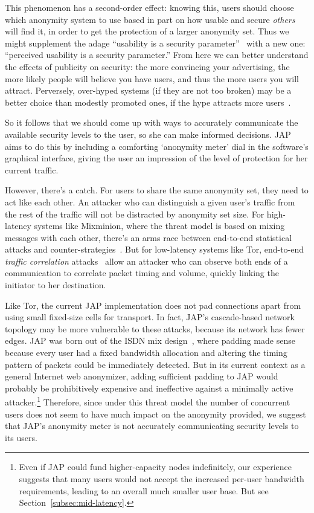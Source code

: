 \documentclass{llncs}
\begin{document}
This phenomenon has a second-order effect: knowing this, users should
choose which anonymity system to use based in part on how usable
and secure
\emph{others} will find it, in order to get the protection of a larger
anonymity set. Thus we might supplement the adage ``usability is a security
parameter''~\cite{back01} with a new one: ``perceived usability is a
security parameter.'' From here we can better understand the effects
of publicity on security: the more convincing your
advertising, the more likely people will believe you have users, and thus
the more users you will attract. Perversely, over-hyped systems (if they
are not too broken) may be a better choice than modestly promoted ones,
if the hype attracts more users~\cite{usability-network-effect}.

So it follows that we should come up with ways to accurately communicate
the available security levels to the user, so she can make informed
decisions. JAP aims to do this by including a
comforting `anonymity meter' dial in the software's graphical interface,
giving the user an impression of the level of protection for her current
traffic.

However, there's a catch. For users to share the same anonymity set,
they need to act like each other. An attacker who can distinguish
a given user's traffic from the rest of the traffic will not be
distracted by anonymity set size. For high-latency systems like
Mixminion, where the threat model is based on mixing messages with each
other, there's an arms race between end-to-end statistical attacks and
counter-strategies~\cite{statistical-disclosure,minion-design,e2e-traffic,trickle02}.
But for low-latency systems like Tor, end-to-end \emph{traffic
correlation} attacks~\cite{danezis-pet2004,defensive-dropping,SS03}
allow an attacker who can observe both ends of a communication
to correlate packet timing and volume, quickly linking
the initiator to her destination. %

Like Tor, the current JAP implementation does not pad connections
apart from using small fixed-size cells for transport. In fact,
JAP's cascade-based network topology may be more vulnerable to these
attacks, because its network has fewer edges. JAP was born out of
the ISDN mix design~\cite{isdn-mixes}, where padding made sense because
every user had a fixed bandwidth allocation and altering the timing
pattern of packets could be immediately detected. But in its current context
as a general Internet web anonymizer, adding sufficient padding to JAP
would probably be prohibitively expensive and ineffective against a
minimally active attacker.\footnote{Even if JAP could
fund higher-capacity nodes indefinitely, our experience
suggests that many users would not accept the increased per-user
bandwidth requirements, leading to an overall much smaller user base. But
see Section~\ref{subsec:mid-latency}.} Therefore, since under this threat
model the number of concurrent users does not seem to have much impact
on the anonymity provided, we suggest that JAP's anonymity meter is not
accurately communicating security levels to its users.
\end{document}
